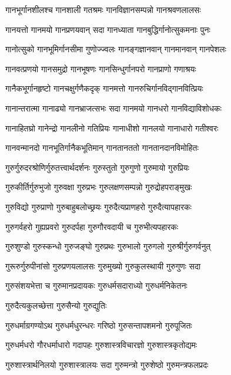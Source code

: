 \twolineshloka
{गानभूर्गानशीलश्च गानशाली गतश्रमः}%
{गानविज्ञानसम्पन्नो गानश्रवणलालसः}%

\twolineshloka
{गानयत्तो गानमयो गानप्रणयवान् सदा}%
{गानध्याता गानबुद्धिर्गानोत्सुकमनाः पुनः}%

\twolineshloka
{गानोत्सुको गानभूमिर्गानसीमा गुणोज्ज्वलः}%
{गानङ्गज्ञानवान् गानमानवान् गानपेशलः}%

\twolineshloka
{गानवत्प्रणयो गानसमुद्रो गानभूषणः}%
{गानसिन्धुर्गानपरो गानप्राणो गणाश्रयः}%

\twolineshloka
{गानैकभूर्गानहृष्टो गानचक्षुर्गणैकदृक्}%
{गानमत्तो गानरुचिर्गानविद्गानवित्प्रियः}%

\twolineshloka
{गानान्तरात्मा गानाढ्यो गानभ्राजत्सभः सदा}%
{गानमयो गानधरो गानविद्याविशोधकः}%

\twolineshloka
{गानाहितघ्रो गानेन्द्रो गानलीनो गतिप्रियः}%
{गानाधीशो गानलयो गानाधारो गतीश्वरः}%

\twolineshloka
{गानवन्मानदो गानभूतिर्गानैकभूतिमान्}%
{गानतानततो गानतानदानविमोहितः}%

\twolineshloka
{गुरुर्गुरुदरश्रोणिर्गुरुतत्त्वार्थदर्शनः}%
{गुरुस्तुतो गुरुगुणो गुरुमायो गुरुप्रियः}%

\twolineshloka
{गुरुकीर्तिर्गुरुभुजो गुरुवक्षा गुरुप्रभः}%
{गुरुलक्षणसम्पन्नो गुरुद्रोहपराङ्मुखः}%

\twolineshloka
{गुरुविद्यो गुरुप्राणो गुरुबाहुबलोच्छ्रयः}%
{गुरुदैत्यप्राणहरो गुरुदैत्यापहारकः}%

\twolineshloka
{गुरुगर्वहरो गुह्यप्रवरो गुरुदर्पहा}%
{गुरुगौरवदायी च गुरुभीत्यपहारकः}%

\twolineshloka
{गुरुशुण्डो गुरुस्कन्धो गुरुजङ्घो गुरुप्रथः}%
{गुरुभालो गुरुगलो गुरुश्रीर्गुरुगर्वनुत्}

\twolineshloka
{गुरूरुर्गुरुपीनांसो गुरुप्रणयलालसः}%
{गुरुमुख्यो गुरुकुलस्थायी गुरुगुणः सदा}%

\twolineshloka
{गुरुसंशयभेत्ता च गुरुमानप्रदायकः}%
{गुरुधर्मसदाराध्यो गुरुधर्मनिकेतनः}%

\onelineshloka
{गुरुदैत्यकुलच्छेत्ता गुरुसैन्यो गुरुद्युतिः}%

\twolineshloka
{गुरुधर्माग्रगण्योऽथ गुरुधर्मधुरन्धरः}%
{गरिष्ठो गुरुसन्तापशमनो गुरुपूजितः}%

\twolineshloka
{गुरुधर्मधरो गौरधर्माधारो गदापहः}%
{गुरुशास्त्रविचारज्ञो गुरुशास्त्रकृतोद्यमः}%

\twolineshloka
{गुरुशास्त्रार्थनिलयो गुरुशास्त्रालयः सदा}%
{गुरुमन्त्रो गुरुशेष्ठो गुरुमन्त्रफलप्रदः}%

